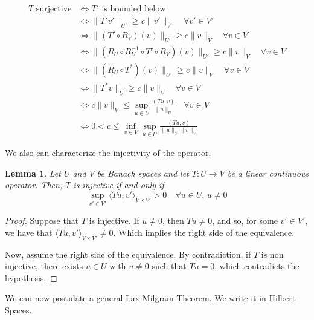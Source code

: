 \documentclass{article}
\newtheorem{lemma}{Lemma}
\begin{document}
\begin{align*}
    T \text{ surjective}
    &\Longleftrightarrow 
    T'\text{ is bounded below}
    \\&\Longleftrightarrow 
    \lVert T'v' \rVert_{U'} \ge c \lVert v' \rVert_{V'} \quad \forall v'\in V'
    \\&\Longleftrightarrow 
    \lVert (T'\circ R_V) (v) \rVert_{U'} \ge c \lVert v \rVert_{V} 
    \quad \forall v\in V
    \\&\Longleftrightarrow 
    \lVert (R_U \circ R_U^{-1} \circ T'\circ R_V) (v) \rVert_{U'} 
    \ge c \lVert v \rVert_{V} \quad \forall v\in V
    \\&\Longleftrightarrow 
    \lVert (R_U \circ T^*) (v) \rVert_{U'} 
    \ge c \lVert v \rVert_{V} \quad \forall v\in V
    \\&\Longleftrightarrow 
    \lVert T^* v \rVert_{U} 
    \ge c \lVert v \rVert_{V} \quad \forall v\in V
    \\&\Longleftrightarrow 
    c \lVert v \rVert_{V}  
    \le \sup_{u\in U}\frac{(Tu, v)}{\lVert u \rVert_{U}} \quad \forall v\in V
    \\&\Longleftrightarrow 
    0 < c \le \inf_{v\in V}\sup_{u\in U}
    \frac{(Tu, v)}{\lVert u \rVert_{U}\lVert v \rVert_{V}}
\end{align*}

We also can characterize the injectivity of the operator.

\begin{lemma}
    Let \(U\) and \(V\) be Banach spaces and let \(T:U\to V\) be a linear 
    continuous operator. Then, \(T\) is injective if and only if 
    \[\sup_{v'\in V'} \langle Tu, v'\rangle_{V\times V'} > 0 
    \quad \forall u\in U\text{, }u \neq 0\]
\end{lemma}
\begin{proof}
    Suppose that \(T\) is injective. If \(u\neq 0\), then \(Tu \neq 0\), and so, 
    for some \(v'\in V'\), we have that \(\langle Tu, v'\rangle_{V\times V'} 
    \neq 0\). Which implies the right side of the equivalence.

    Now, assume the right side of the equivalence. By contradiction, if \(T\)
    is non injective, there exists \(u\in U \) with \(u\neq 0\) such that \(Tu = 0\), 
    which contradicts the hypothesis.
\end{proof}

We can now postulate a general Lax-Milgram Theorem. We write it in Hilbert Spaces.
\end{document}
